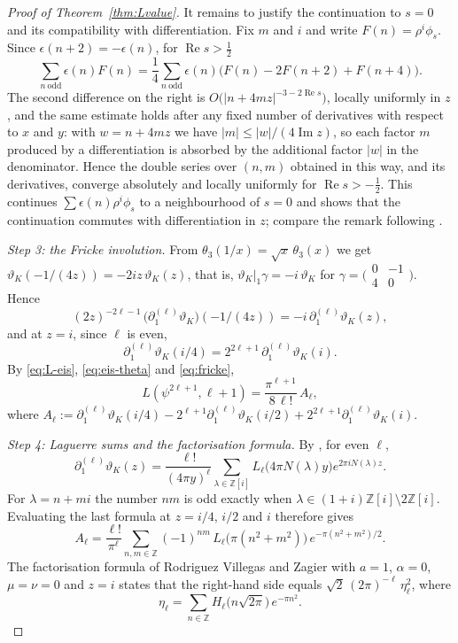 \documentclass[11pt]{amsart}
\theoremstyle{definition}
\theoremstyle{remark}
\newcommand{\Z}{\mathbb{Z}}
\begin{document}
\begin{proof}[Proof of Theorem~\ref{thm:Lvalue}]
It remains to justify the continuation to $s=0$ and its compatibility with differentiation. Fix
$m$ and $i$ and write $F(n)=\rho^i\phi_s$. Since $\epsilon(n+2)=-\epsilon(n)$, for
$\operatorname{Re}s>\frac12$
\[
\sum_{n\ \mathrm{odd}}\epsilon(n)F(n)=\frac14\sum_{n\ \mathrm{odd}}\epsilon(n)\bigl(F(n)-2F(n+2)+F(n+4)\bigr).
\]
The second difference on the right is $O\bigl(|n+4mz|^{-3-2\operatorname{Re}s}\bigr)$, locally
uniformly in $z$, and the same estimate holds after any fixed number of derivatives with respect
to $x$ and $y$: with $w=n+4mz$ we have $|m|\le|w|/(4\operatorname{Im}z)$, so each factor $m$
produced by a differentiation is absorbed by the additional factor $|w|$ in the denominator. Hence the double series over $(n,m)$ obtained in this way, and its derivatives,
converge absolutely and locally uniformly for $\operatorname{Re}s>-\frac12$. This continues
$\sum\epsilon(n)\rho^i\phi_s$ to a neighbourhood of $s=0$ and shows that the continuation commutes
with differentiation in $z$; compare the remark following \cite[(22)]{VZ}.

\emph{Step 3: the Fricke involution.} From $\theta_3(1/x)=\sqrt x\,\theta_3(x)$ we get
$\vartheta_K(-1/(4z))=-2iz\,\vartheta_K(z)$, that is, $\vartheta_K|_1\gamma=-i\,\vartheta_K$ for
$\gamma=\bigl(\begin{smallmatrix}0&-1\\4&0\end{smallmatrix}\bigr)$. Hence
\[
(2z)^{-2\ell-1}\,\bigl(\partial_1^{(\ell)}\vartheta_K\bigr)(-1/(4z))=-i\,\partial_1^{(\ell)}\vartheta_K(z),
\]
and at $z=i$, since $\ell$ is even,
\begin{equation}\label{eq:fricke}
\partial_1^{(\ell)}\vartheta_K(i/4)=2^{2\ell+1}\,\partial_1^{(\ell)}\vartheta_K(i).
\end{equation}
By \eqref{eq:L-eis}, \eqref{eq:eis-theta} and \eqref{eq:fricke},
\begin{equation}\label{eq:L-A}
L(\psi^{2\ell+1},\ell+1)=\frac{\pi^{\ell+1}}{8\,\ell!}\,A_\ell,
\end{equation}
where
$A_\ell:=\partial_1^{(\ell)}\vartheta_K(i/4)-2^{\ell+1}\partial_1^{(\ell)}\vartheta_K(i/2)
+2^{2\ell+1}\partial_1^{(\ell)}\vartheta_K(i)$.

\emph{Step 4: Laguerre sums and the factorisation formula.} By \cite[(9)]{VZ}, for even $\ell$,
\[
\partial_1^{(\ell)}\vartheta_K(z)=\frac{\ell!}{(4\pi y)^\ell}\sum_{\lambda\in\Z[i]}L_\ell\bigl(4\pi N(\lambda)y\bigr)
e^{2\pi iN(\lambda)z}.
\]
For $\lambda=n+mi$ the number $nm$ is odd exactly when $\lambda\in(1+i)\Z[i]\setminus2\Z[i]$.
Evaluating the last formula at $z=i/4$, $i/2$ and $i$ therefore gives
\[
A_\ell=\frac{\ell!}{\pi^\ell}\sum_{n,m\in\Z}(-1)^{nm}\,L_\ell\bigl(\pi(n^2+m^2)\bigr)\,e^{-\pi(n^2+m^2)/2}.
\]
The factorisation formula of Rodriguez Villegas and Zagier \cite[(23)]{VZ} with $a=1$,
$\alpha=0$, $\mu=\nu=0$ and $z=i$ states that the
right-hand side equals $\sqrt2\,(2\pi)^{-\ell}\,\eta_\ell^2$, where
\[
\eta_\ell=\sum_{n\in\Z}H_\ell\bigl(n\sqrt{2\pi}\bigr)\,e^{-\pi n^2}.
\]


\end{proof}
\end{document}

